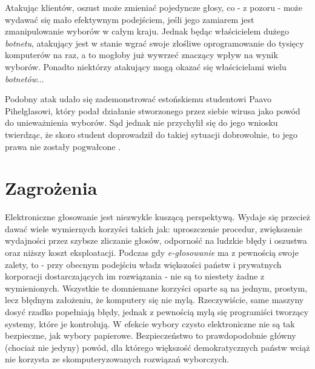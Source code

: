 \documentclass[polish]{kbk}
\begin{document}
Atakując klientów, oszust może zmieniać pojedyncze głosy, co - z pozoru - może wydawać się mało efektywnym podejściem, jeśli jego zamiarem jest zmanipulowanie wyborów w całym kraju. Jednak będąc właścicielem dużego \textit{botnetu}, atakujący jest w stanie wgrać swoje złośliwe oprogramowanie do tysięcy komputerów na raz, a to mogłoby już wywrzeć znaczący wpływ na wynik wyborów. Ponadto niektórzy atakujący mogą okazać się właścicielami wielu \textit{botnetów}...

Podobny atak udało się zademonstrować estońskiemu studentowi Paavo Pihelglasowi, który podał działanie stworzonego przez siebie wirusa jako powód do unieważnienia wyborów. Sąd jednak nie przychylił się do jego wniosku twierdząc, że skoro student doprowadził do takiej sytuacji dobrowolnie, to jego prawa nie zostały pogwałcone \cite{trojan}.

\section{Zagrożenia}
Elektroniczne głosowanie jest niezwykle kuszącą perspektywą. Wydaje się przecież dawać wiele wymiernych korzyści takich jak: uproszczenie procedur, zwiększenie wydajności przez szybsze zliczanie głosów, odporność na ludzkie błędy i oszustwa oraz niższy koszt eksploatacji. Podczas gdy \textit{e-głosowanie} ma z pewnością swoje zalety, to - przy obecnym podejściu władz większości państw i prywatnych korporacji dostarczających im rozwiązania - nie są to niestety żadne z wymienionych. Wszystkie te domniemane korzyści oparte są na jednym, prostym, lecz błędnym założeniu, że komputery się nie mylą. Rzeczywiście, same maszyny dosyć rzadko popełniają błędy, jednak z pewnością mylą się programiści tworzący systemy, które je kontrolują. W efekcie wybory czysto elektroniczne nie są tak bezpieczne, jak wybory papierowe. Bezpieczeństwo to prawdopodobnie główny (chociaż nie jedyny) powód, dla którego większość demokratycznych państw wciąż nie korzysta ze skomputeryzowanych rozwiązań wyborczych.
\end{document}
